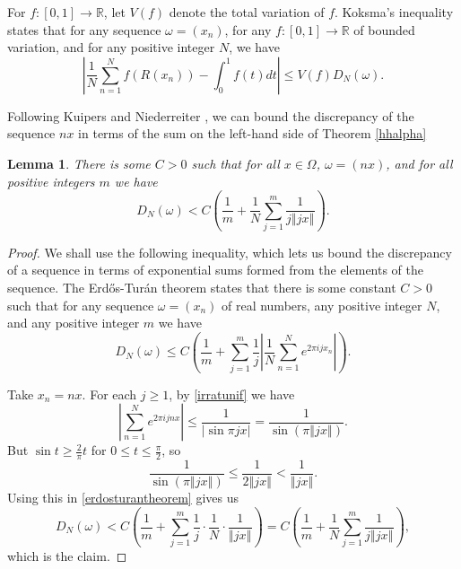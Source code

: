 \documentclass{article}
\newcommand{\norm}[1]{\left\Vert #1 \right\Vert}
\newtheorem{lemma}[theorem]{Lemma}
\begin{document}
For $f:[0,1] \to \mathbb{R}$, let $V(f)$ denote the total variation of $f$.
Koksma's inequality \cite[p.~143, Theorem 5.1]{kuipers} states that for any sequence $\omega=(x_n)$,  
for any $f:[0,1] \to \mathbb{R}$ of bounded variation, and for any positive integer $N$, we have
\begin{equation}
\left| \frac{1}{N} \sum_{n=1}^N f(R(x_n))-\int_0^1 f(t) dt \right| \leq V(f) D_N(\omega).
\label{koksma}
\end{equation}


Following Kuipers and Niederreiter \cite[p.~122, Lemma 3.2]{kuipers}, we can bound the discrepancy of the sequence $nx$ in terms of the sum on the left-hand side
of  Theorem \ref{hhalpha}

\begin{lemma}
There is some $C>0$ such that for all  $x \in \Omega$,  $\omega=(nx)$, and for all positive integers $m$
we have
\[
D_N(\omega) < C\left(\frac{1}{m}+\frac{1}{N}\sum_{j=1}^m \frac{1}{j \norm{jx}}\right).
\]
\label{erdosturan}
\end{lemma}
\begin{proof}
We shall use the following inequality, which lets us bound the discrepancy of a sequence in terms of exponential sums formed from the elements of the sequence.
The Erd\H os-Tur\'an theorem \cite[p.~114, Eq. 2.42]{kuipers} states that there is some constant $C>0$ such that for any sequence
 $\omega=(x_n)$ of real numbers, any positive integer $N$, and any positive integer $m$ we have
\begin{equation}
 D_N(\omega) \leq C\left(\frac{1}{m}+\sum_{j=1}^m \frac{1}{j} \left| \frac{1}{N} \sum_{n=1}^N e^{2\pi i j x_n} \right| \right).
 \label{erdosturantheorem}
\end{equation}

Take $x_n=nx$. For each $j \geq 1$, by \eqref{irratunif} we have
\[
\left| \sum_{n=1}^N e^{2\pi i jnx} \right| 
\leq \frac{1}{| \sin \pi j x|}
=\frac{1}{\sin(\pi \norm{jx})}.
\]
But $\sin t \geq \frac{2}{\pi}t$ for $0 \leq t \leq \frac{\pi}{2}$, so 
\[
\frac{1}{\sin(\pi \norm{jx})} \leq \frac{1}{2\norm{jx}}<\frac{1}{\norm{jx}}.
\]
Using this in \eqref{erdosturantheorem} gives us
\[
D_N(\omega) < C\left(\frac{1}{m}+\sum_{j=1}^m \frac{1}{j} \cdot \frac{1}{N} \cdot \frac{1}{\norm{jx}}\right)
= C\left(\frac{1}{m}+\frac{1}{N} \sum_{j=1}^m \frac{1}{j\norm{jx}}\right),
\]
which is the claim.
\end{proof}
\end{document}
